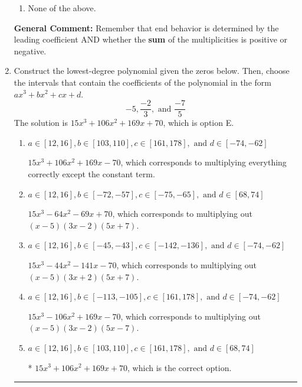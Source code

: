 \documentclass{extbook}[14pt]
\newcommand{\litem}[1]{\item #1

\rule{\textwidth}{0.4pt}}
\begin{document}
\begin{enumerate}
{\begin{enumerate}[label=\Alph*.]
\begin{multicols}{2}
\end{multicols}\item None of the above.\end{enumerate}
\textbf{General Comment:} Remember that end behavior is determined by the leading coefficient AND whether the \textbf{sum} of the multiplicities is positive or negative.
}
\litem{
Construct the lowest-degree polynomial given the zeros below. Then, choose the intervals that contain the coefficients of the polynomial in the form $ax^3+bx^2+cx+d$.
\[ -5, \frac{-2}{3}, \text{ and } \frac{-7}{5} \]The solution is \( 15x^{3} +106 x^{2} +169 x + 70 \), which is option E.\begin{enumerate}[label=\Alph*.]
\item \( a \in [12, 16], b \in [103, 110], c \in [161, 178], \text{ and } d \in [-74, -62] \)

$15x^{3} +106 x^{2} +169 x -70$, which corresponds to multiplying everything correctly except the constant term.
\item \( a \in [12, 16], b \in [-72, -57], c \in [-75, -65], \text{ and } d \in [68, 74] \)

$15x^{3} -64 x^{2} -69 x + 70$, which corresponds to multiplying out $(x -5)(3x -2)(5x + 7)$.
\item \( a \in [12, 16], b \in [-45, -43], c \in [-142, -136], \text{ and } d \in [-74, -62] \)

$15x^{3} -44 x^{2} -141 x -70$, which corresponds to multiplying out $(x -5)(3x + 2)(5x + 7)$.
\item \( a \in [12, 16], b \in [-113, -105], c \in [161, 178], \text{ and } d \in [-74, -62] \)

$15x^{3} -106 x^{2} +169 x -70$, which corresponds to multiplying out $(x -5)(3x -2)(5x -7)$.
\item \( a \in [12, 16], b \in [103, 110], c \in [161, 178], \text{ and } d \in [68, 74] \)

* $15x^{3} +106 x^{2} +169 x + 70$, which is the correct option.
\end{enumerate}

}
\end{enumerate}
\end{document}
